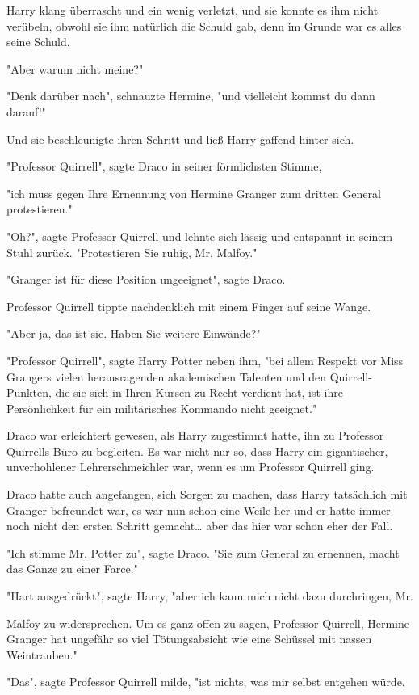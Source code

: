 {Harry klang überrascht und ein wenig verletzt, und sie konnte es ihm nicht verübeln, obwohl sie ihm natürlich die Schuld gab, denn im Grunde war es alles seine Schuld.

"Aber warum nicht meine?"

"Denk darüber nach", schnauzte Hermine, "und vielleicht kommst du dann darauf!"

Und sie beschleunigte ihren Schritt und ließ Harry gaffend hinter sich.

"Professor Quirrell", sagte Draco in seiner förmlichsten Stimme,

"ich muss gegen Ihre Ernennung von Hermine Granger zum dritten General protestieren."

"Oh?", sagte Professor Quirrell und lehnte sich lässig und entspannt in seinem Stuhl zurück. "Protestieren Sie ruhig, Mr. Malfoy."

"Granger ist für diese Position ungeeignet", sagte Draco.

Professor Quirrell tippte nachdenklich mit einem Finger auf seine Wange.

"Aber ja, das ist sie. Haben Sie weitere Einwände?"

"Professor Quirrell", sagte Harry Potter neben ihm, "bei allem Respekt vor Miss Grangers vielen herausragenden akademischen Talenten und den Quirrell-Punkten, die sie sich in Ihren Kursen zu Recht verdient hat, ist ihre Persönlichkeit für ein militärisches Kommando nicht geeignet."

Draco war erleichtert gewesen, als Harry zugestimmt hatte, ihn zu Professor Quirrells Büro zu begleiten. Es war nicht nur so, dass Harry ein gigantischer, unverhohlener Lehrerschmeichler war, wenn es um Professor Quirrell ging.

Draco hatte auch angefangen, sich Sorgen zu machen, dass Harry tatsächlich mit Granger befreundet war, es war nun schon eine Weile her und er hatte immer noch nicht den ersten Schritt gemacht… aber das hier war schon eher der Fall.

"Ich stimme Mr. Potter zu", sagte Draco. "Sie zum General zu ernennen, macht das Ganze zu einer Farce."

"Hart ausgedrückt", sagte Harry, "aber ich kann mich nicht dazu durchringen, Mr.

Malfoy zu widersprechen. Um es ganz offen zu sagen, Professor Quirrell, Hermine Granger hat ungefähr so viel Tötungsabsicht wie eine Schüssel mit nassen Weintrauben."

"Das", sagte Professor Quirrell milde, "ist nichts, was mir selbst entgehen würde.

}
